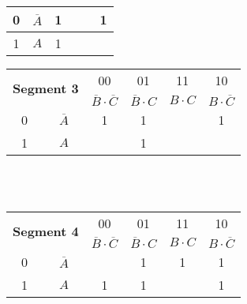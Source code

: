 \documentclass[12pt]{article}
\begin{document}
\begin{center}
\begin{tabular}{|c|c| |c|c|c|c|}
		0                                                 & $\overline{A}$                    & 1                      &             &                        & 1 \\ \hline
		1                                                 & $A$                               & 1                      &             &                        &   \\ \hline
	\end{tabular} \hspace*{15mm}
	\begin{tabular}{|c|c| |c|c|c|c|}
		\hline
		\multicolumn{2}{|c||}{\multirow{2}{*}{\textbf{Segment 3}}} & 00                                & 01                     & 11          & 10                         \\ \cline{3-6}
		\multicolumn{2}{|c||}{}                           & $\overline{B} \cdot \overline{C}$ & $\overline{B} \cdot C$ & $B \cdot C$ & $B \cdot \overline{C}$     \\  \cline{3-6}  \hline \hline
		0                                                 & $\overline{A}$                    & 1                      & 1           &                        & 1 \\ \hline
		1                                                 & $A$                               &                        & 1           &                        &   \\ \hline
	\end{tabular} \leavevmode \\\leavevmode\\ [15mm]
	\begin{tabular}{|c|c| |c|c|c|c|}
		\hline
		\multicolumn{2}{|c||}{\multirow{2}{*}{\textbf{Segment 4}}} & 00                                & 01                     & 11          & 10                         \\ \cline{3-6}
		\multicolumn{2}{|c||}{}                           & $\overline{B} \cdot \overline{C}$ & $\overline{B} \cdot C$ & $B \cdot C$ & $B \cdot \overline{C}$     \\  \cline{3-6}  \hline \hline
		0                                                 & $\overline{A}$                    &                        & 1           & 1                      & 1 \\ \hline
		1                                                 & $A$                               & 1                      & 1           &                        & 1 \\ \hline
	\end{tabular} \hspace*{15mm}

\end{center}
\end{document}
